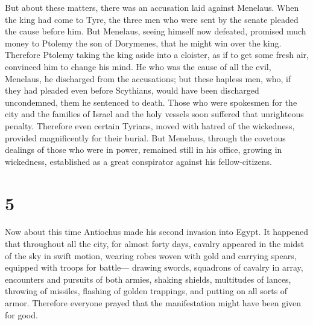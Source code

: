  But about these matters, there was an accusation laid
against Menelaus.  When the king had come to Tyre, the
three men who were sent by the senate pleaded the cause before him.
 But Menelaus, seeing himself now defeated, promised much
money to Ptolemy the son of Dorymenes, that he might win over the king.
 Therefore Ptolemy taking the king aside into a cloister,
as if to get some fresh air, convinced him to change his mind.
 He who was the cause of all the evil, Menelaus, he
discharged from the accusations; but these hapless men, who, if they had
pleaded even before Scythians, would have been discharged uncondemned,
them he sentenced to death.  Those who were spokesmen for
the city and the families of Israel and the holy vessels soon suffered
that unrighteous penalty.  Therefore even certain Tyrians,
moved with hatred of the wickedness, provided magnificently for their
burial.  But Menelaus, through the covetous dealings of
those who were in power, remained still in his office, growing in
wickedness, established as a great conspirator against his
fellow-citizens.

\hypertarget{section-3}{%
\section{5}\label{section-3}}

 Now about this time Antiochus made his second invasion into
Egypt.  It happened that throughout all the city, for almost
forty days, cavalry appeared in the midst of the sky in swift motion,
wearing robes woven with gold and carrying spears, equipped with troops
for battle---  drawing swords, squadrons of cavalry in
array, encounters and pursuits of both armies, shaking shields,
multitudes of lances, throwing of missiles, flashing of golden
trappings, and putting on all sorts of armor.  Therefore
everyone prayed that the manifestation might have been given for good.

